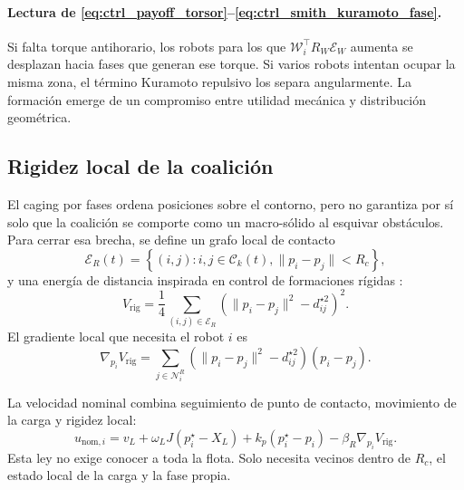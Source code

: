 \paragraph{Lectura de \eqref{eq:ctrl_payoff_torsor}--\eqref{eq:ctrl_smith_kuramoto_fase}.}
Si falta torque antihorario, los robots para los que
$\mathcal W_i^\top R_W\mathcal E_W$ aumenta se desplazan hacia fases que generan ese
torque. Si varios robots intentan ocupar la misma zona, el término Kuramoto repulsivo
los separa angularmente. La formación emerge de un compromiso entre utilidad mecánica y
distribución geométrica.

\subsection{Rigidez local de la coalición}
\label{subsec:control-rigidez}

El caging por fases ordena posiciones sobre el contorno, pero no garantiza por sí solo
que la coalición se comporte como un macro-sólido al esquivar obstáculos. Para cerrar
esa brecha, se define un grafo local de contacto
\begin{equation}
  \mathcal E_R(t)
  =
  \left\{
    (i,j):
    i,j\in\mathcal C_k(t),
    \|p_i-p_j\|<R_c
  \right\},
  \label{eq:ctrl_grafo_rigidez}
\end{equation}
y una energía de distancia inspirada en control de formaciones rígidas
\citep{bullo2009distributed}:
\begin{equation}
  V_{\mathrm{rig}}
  =
  \frac14
  \sum_{(i,j)\in\mathcal E_R}
  \left(
    \|p_i-p_j\|^2-d_{ij}^{\star 2}
  \right)^2 .
  \label{eq:ctrl_energia_rigidez}
\end{equation}
El gradiente local que necesita el robot $i$ es
\begin{equation}
  \nabla_{p_i}V_{\mathrm{rig}}
  =
  \sum_{j\in\mathcal N_i^R}
  \left(
    \|p_i-p_j\|^2-d_{ij}^{\star 2}
  \right)(p_i-p_j).
  \label{eq:ctrl_gradiente_rigidez}
\end{equation}

La velocidad nominal combina seguimiento de punto de contacto, movimiento de la carga y
rigidez local:
\begin{equation}
  u_{\mathrm{nom},i}
  =
  v_L
  +
  \omega_LJ(p_i^\star-X_L)
  +
  k_p(p_i^\star-p_i)
  -
  \beta_R\nabla_{p_i}V_{\mathrm{rig}} .
  \label{eq:ctrl_velocidad_nominal}
\end{equation}
Esta ley no exige conocer a toda la flota. Solo necesita vecinos dentro de $R_c$, el
estado local de la carga y la fase propia.

